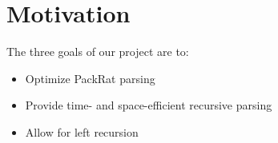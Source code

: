 \section{Motivation}

The three goals of our project are to:

\begin{itemize}
  \item Optimize PackRat parsing
  \item Provide time- and space-efficient recursive parsing
  \item Allow for left recursion
\end{itemize}


